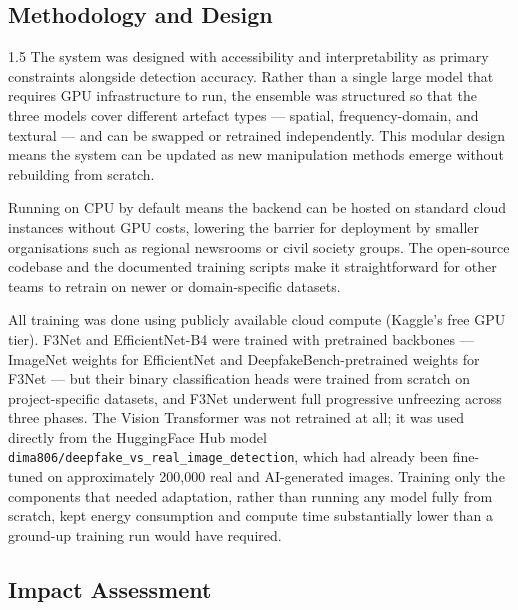 \subsection{Methodology and Design}

\begin{spacing}{1.5}
The system was designed with accessibility and interpretability as primary constraints alongside detection accuracy. Rather than a single large model that requires GPU infrastructure to run, the ensemble was structured so that the three models cover different artefact types --- spatial, frequency-domain, and textural --- and can be swapped or retrained independently. This modular design means the system can be updated as new manipulation methods emerge without rebuilding from scratch.

Running on CPU by default means the backend can be hosted on standard cloud instances without GPU costs, lowering the barrier for deployment by smaller organisations such as regional newsrooms or civil society groups. The open-source codebase and the documented training scripts make it straightforward for other teams to retrain on newer or domain-specific datasets.

All training was done using publicly available cloud compute (Kaggle's free GPU tier). F3Net and EfficientNet-B4 were trained with pretrained backbones --- ImageNet weights for EfficientNet and DeepfakeBench-pretrained weights for F3Net --- but their binary classification heads were trained from scratch on project-specific datasets, and F3Net underwent full progressive unfreezing across three phases. The Vision Transformer was not retrained at all; it was used directly from the HuggingFace Hub model \texttt{dima806/deepfake\_vs\_real\_image\_detection}, which had already been fine-tuned on approximately 200,000 real and AI-generated images. Training only the components that needed adaptation, rather than running any model fully from scratch, kept energy consumption and compute time substantially lower than a ground-up training run would have required.
\end{spacing}

\subsection{Impact Assessment}

